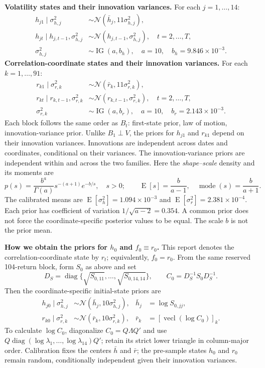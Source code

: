\documentclass[10pt,a4paper]{article}
\newcommand{\Normal}{\mathcal N}
\newcommand{\IG}{\operatorname{IG}}
\newcommand{\diag}{\operatorname{diag}}
\newcommand{\vecl}{\operatorname{vecl}}
\newcommand{\E}{\operatorname E}
\begin{document}
\textbf{Volatility states and their innovation variances.} For each $j=1,\ldots,14$:
\begin{align*}
h_{j1}\mid\sigma_{h,j}^2
&\sim\Normal(\bar h_j,11\sigma_{h,j}^2),\\
h_{jt}\mid h_{j,t-1},\sigma_{h,j}^2
&\sim\Normal(h_{j,t-1},\sigma_{h,j}^2),\quad t=2,\ldots,T,\\
\sigma_{h,j}^2&\sim\IG(a,b_h),\quad a=10,\quad b_h=9.846\times10^{-3}.
\end{align*}
\textbf{Correlation-coordinate states and their innovation variances.} For each $k=1,\ldots,91$:
\begin{align*}
r_{k1}\mid\sigma_{r,k}^2
&\sim\Normal(\bar r_k,11\sigma_{r,k}^2),\\
r_{kt}\mid r_{k,t-1},\sigma_{r,k}^2
&\sim\Normal(r_{k,t-1},\sigma_{r,k}^2),\quad t=2,\ldots,T,\\
\sigma_{r,k}^2&\sim\IG(a,b_r),\quad a=10,\quad b_r=2.143\times10^{-3}.
\end{align*}
Each block follows the same order as $B_t$: first-state prior, law of motion, innovation-variance prior.
Unlike $B_1\perp V$, the priors for $h_{j1}$ and $r_{k1}$ depend on their innovation variances.
Innovations are independent across dates and coordinates, conditional on their variances.
The innovation-variance priors are independent within and across the two families.
Here the \emph{shape--scale} density and its moments are
\[
p(s)=\frac{b^a}{\Gamma(a)}s^{-(a+1)}e^{-b/s},\quad s>0;\qquad
\E[s]=\frac b{a-1},\quad\operatorname{mode}(s)=\frac b{a+1}.
\]
The calibrated means are $\E[\sigma_h^2]=1.094\times10^{-3}$ and
$\E[\sigma_r^2]=2.381\times10^{-4}$. Each prior has coefficient of variation
$1/\sqrt{a-2}=0.354$. A common prior does not force the coordinate-specific posterior values
to be equal. The scale $b$ is not the prior mean.

\textbf{How we obtain the priors for $h_0$ and $f_0\equiv r_0$.}
This report denotes the correlation-coordinate state by $r_t$; equivalently, $f_0=r_0$.
From the same reserved 104-return block, form $S_0$ as above and set
\[
D_S=\diag\{\sqrt{S_{0,11}},\ldots,\sqrt{S_{0,14,14}}\},\qquad
C_0=D_S^{-1}S_0D_S^{-1}.
\]
Then the coordinate-specific initial-state priors are
\begin{align*}
h_{j0}\mid\sigma_{h,j}^2&\sim\Normal(\bar h_j,10\sigma_{h,j}^2),
&\bar h_j&=\log S_{0,jj},\\
r_{k0}\mid\sigma_{r,k}^2&\sim\Normal(\bar r_k,10\sigma_{r,k}^2),
&\bar r_k&=[\vecl(\log C_0)]_k.
\end{align*}
To calculate $\log C_0$, diagonalize $C_0=Q\Lambda Q'$ and use
$Q\diag(\log\lambda_1,\ldots,\log\lambda_{14})Q'$; retain its strict lower triangle
in column-major order. Calibration fixes the centers $\bar h$ and $\bar r$;
the pre-sample states $h_0$ and $r_0$ remain random, conditionally independent given
their innovation variances.
\end{document}
